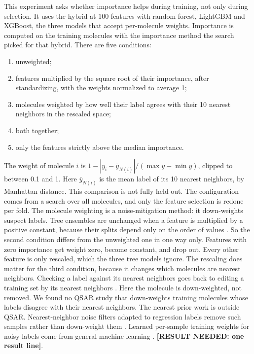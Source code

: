 This experiment asks whether importance helps during training, not only during selection. It uses the hybrid at 100 features with random forest, LightGBM and XGBoost, the three models that accept per-molecule weights. Importance is computed on the training molecules with the importance method the search picked for that hybrid. There are five conditions:
\begin{enumerate}[leftmargin=*]
    \item unweighted;
    \item features multiplied by the square root of their importance, after standardizing, with the weights normalized to average 1;
    \item molecules weighted by how well their label agrees with their 10 nearest neighbors in the rescaled space;
    \item both together;
    \item only the features strictly above the median importance.
\end{enumerate}
The weight of molecule $i$ is $1 - |y_i - \bar y_{N(i)}| / (\max y - \min y)$, clipped to between 0.1 and 1. Here $\bar y_{N(i)}$ is the mean label of its 10 nearest neighbors, by Manhattan distance. This comparison is not fully held out. The configuration comes from a search over all molecules, and only the feature selection is redone per fold. The molecule weighting is a noise-mitigation method: it down-weights suspect labels. Tree ensembles are unchanged when a feature is multiplied by a positive constant, because their splits depend only on the order of values \citep{Hastie2009}. So the second condition differs from the unweighted one in one way only. Features with zero importance get weight zero, become constant, and drop out. Every other feature is only rescaled, which the three tree models ignore. The rescaling does matter for the third condition, because it changes which molecules are nearest neighbors. Checking a label against its nearest neighbors goes back to editing a training set by its nearest neighbors \citep{Wilson1972}. Here the molecule is down-weighted, not removed. We found no QSAR study that down-weights training molecules whose labels disagree with their nearest neighbors. The nearest prior work is outside QSAR. Nearest-neighbor noise filters adapted to regression labels remove such samples rather than down-weight them \citep{Martin2021}. Learned per-sample training weights for noisy labels come from general machine learning \citep{shu2019metaweightnet}. \textbf{[RESULT NEEDED: one result line]}.

